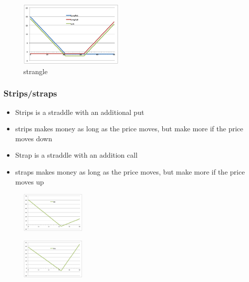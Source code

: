\begin{multicols}{2}
\begin{figure}[H]
    \centering 
    \includegraphics[width =0.45\textwidth]{Figure/strangle.png}
    \caption*{strangle}
\end{figure}
\subsubsection{Strips/straps}
\begin{itemize}
    \item Strips is a straddle with an additional put 
    \item strips makes money as long as the price moves, but make more if the price moves down 
    \item Strap is a straddle with an addition call
    \item straps makes money as long as the price moves, but make more if the price moves up
\end{itemize}

\begin{figure}[H]
    \centering 
    \includegraphics[width =0.28\textwidth]{Figure/strip.png}
\end{figure}
\vspace*{-0.9cm}
\begin{figure}[H]
    \centering 
    \includegraphics[width =0.28\textwidth]{Figure/strap.png}
\end{figure}


\end{multicols}
